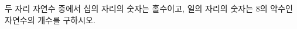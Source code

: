\hspace*{2mm}\begin{minipage}[t]{\dimexpr\linewidth-2mm\relax}\vspace{0pt}
두 자리 자연수 중에서 십의 자리의 숫자는 홀수이고, 일의 자리의 숫자는 $8$의 약수인 자연수의 개수를 구하시오.\end{minipage}
